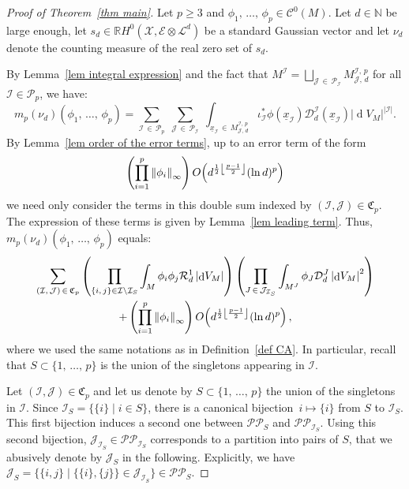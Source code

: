 \documentclass[AHL,Unicode,longabstracts,published]{cedram}
\DeclareMathOperator{\dmesure}{d}
\DeclarePairedDelimiter{\floor}{\lfloor}{\rfloor}
\newcommand{\D}{\mathcal{D}}
\newcommand{\E}{\mathcal{E}}
\newcommand{\I}{\mathcal{I}}
\newcommand{\J}{\mathcal{J}}
\newcommand{\X}{\mathcal{X}}
\renewcommand{\L}{\mathcal{L}}
\newcommand{\clC}{\mathcal{C}}
\newcommand{\clR}{\mathcal{R}}
\newcommand{\frkC}{\mathfrak{C}}
\newcommand{\pa}{\mathcal{P}\!}
\newcommand{\pp}{\mathcal{P\!P}\!}
\newcommand{\N}{\mathbb{N}}
\newcommand{\R}{\mathbb{R}}
\newcommand{\norm}[1]{\left\lvert #1 \right\rvert}
\newcommand{\Norm}[1]{\left\lVert #1 \right\rVert}
\newcommand{\rmes}[1]{\norm{\dmesure\! V_{#1}}}
\renewcommand{\H}{H^0(\X,\E \otimes \L^d)}
\renewcommand{\geq}{\geqslant}
\begin{document}
\begin{proof}[{Proof of Theorem~\ref{thm main}}]
Let $p \geq 3$ and $\phi_1,\,\dots,\,\phi_p \in \clC^0(M)$. Let $d \in \N$ be large enough, let $s_d \in \R\H$ be a standard Gaussian vector and let $\nu_d$ denote the counting measure of the real zero set of $s_d$.

By Lemma~\ref{lem integral expression} and the fact that $M^\I = \bigsqcup_{\J\,\in\,\pa_\I} M^{\I,\,p}_{\J,\,d}$ for all $\I \in \pa_p$, we have:
\[
m_p(\nu_d)(\phi_1,\,\dots,\,\phi_p) = \sum_{\I\,\in\,\pa_p} \;\sum_{\J\,\in\,\pa_\I}\;\int_{\underline{x}_\I\,\in\,M^{\I,\,p}_{\J,\,d}} \iota_\I^* \phi\left(\underline{x}_\I\right) \D_d^\I\left(\underline{x}_\I\right) \rmes{M}^{\norm{\I}}.
\]
By Lemma~\ref{lem order of the error terms}, up to an error term of the form
\[
\left(\prod_{i=1}^p \Norm{\phi_i}_\infty \right)O\!\left(d^{\frac{1}{2}\floor*{\frac{p-1}{2}}}(\ln d)^p\right)
\]
we need only consider the terms in this double sum indexed by $(\I,\J) \in \frkC_p$. The expression of these terms is given by Lemma~\ref{lem leading term}. Thus, $m_p(\nu_d)(\phi_1,\,\dots,\,\phi_p)$ equals:
\begin{multline}\label{eq mp}
\sum_{(\I,\,\J)\,\in\,\frkC_p} \left(\prod_{\{i,\,j\} \in \I \setminus \I_S} \int_M \phi_i\phi_j\clR^1_d \rmes{M}\right)\left(\prod_{J\,\in\,\J_{\I_S}} \int_{M^J} \phi_J \D_d^J \rmes{M}^2 \right)\\
+ \left(\prod_{i=1}^p \Norm{\phi_i}_\infty\right) O\!\left(d^{\frac{1}{2}\floor*{\frac{p-1}{2}}}(\ln d)^p\right),
\end{multline}
where we used the same notations as in Definition~\ref{def CA}. In particular, recall that $S \subset \{1,\,\dots,\,p\}$ is the union of the singletons appearing in $\I$.

Let $(\I,\J) \in \frkC_p$ and let us denote by $S \subset \{1,\,\dots,\,p\}$ the union of the singletons in $\I$. Since $\I_S = \{\{i\} \mid i \in S\}$, there is a canonical bijection~$i \mapsto \{i\}$ from $S$ to $\I_S$. This first bijection induces a second one between $\pp_S$ and $\pp_{\I_S}$. Using this second bijection, $\J_{\I_S} \in \pp_{\I_S}$ corresponds to a partition into pairs of $S$, that we abusively denote by $\J_S$ in the following. Explicitly, we have $\J_S = \{\{i,j\} \mid \{\{i\},\{j\}\} \in \J_{\I_S}\} \in \pp_S$.


\end{proof}
\end{document}
